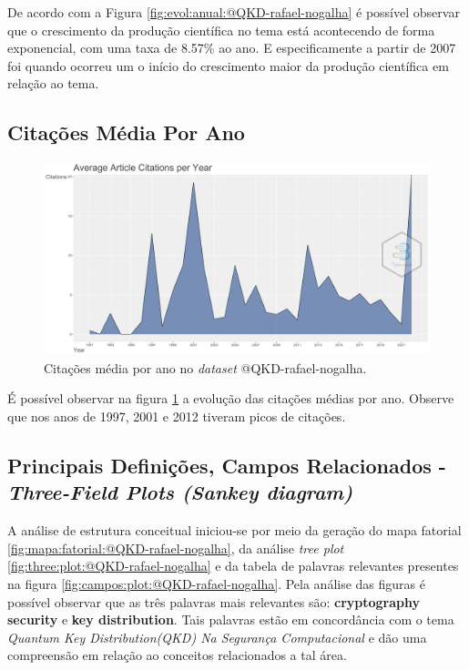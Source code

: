 De acordo com a Figura \ref{fig:evol:anual:@QKD-rafael-nogalha} é possível observar que o crescimento da produção científica no tema está acontecendo de forma exponencial, com uma taxa de 8.57\% ao ano. E especificamente a partir de 2007 foi quando ocorreu um o início do crescimento maior da produção científica em relação ao tema.

\subsection{Citações Média Por Ano}

\begin{figure}[H]
    \centering
    \includegraphics[width=1\textwidth]{experiments/rafaelnogalha/PesquisaBibliografica/QKDSegurancaComputacional/images/citacoes-media-por-ano.png}
    \caption{Citações média por ano no \textit{dataset} @QKD-rafael-nogalha.}
    \label{fig:citacoes:anual:@QKD-rafael-nogalha}
\end{figure}

É possível observar na figura \ref{fig:citacoes:anual:@QKD-rafael-nogalha} a evolução das citações médias por ano. Observe que nos anos de 1997, 2001 e 2012 tiveram picos de citações.

\subsection{Principais Definições, Campos Relacionados - \textit{Three-Field Plots (Sankey diagram)}}

A análise de estrutura conceitual iniciou-se por meio da geração do mapa fatorial \ref{fig:mapa:fatorial:@QKD-rafael-nogalha}, da análise \textit{tree plot} \ref{fig:three:plot:@QKD-rafael-nogalha} e da tabela de palavras relevantes presentes na figura \ref{fig:campos:plot:@QKD-rafael-nogalha}. Pela análise das figuras é possível observar que as três palavras mais relevantes são: \textbf{cryptography} \textbf{security} e \textbf{key distribution}. Tais palavras estão em concordância com o tema \textit{Quantum Key Distribution(QKD) Na Segurança Computacional} e dão uma compreensão em relação ao conceitos relacionados a tal área.

